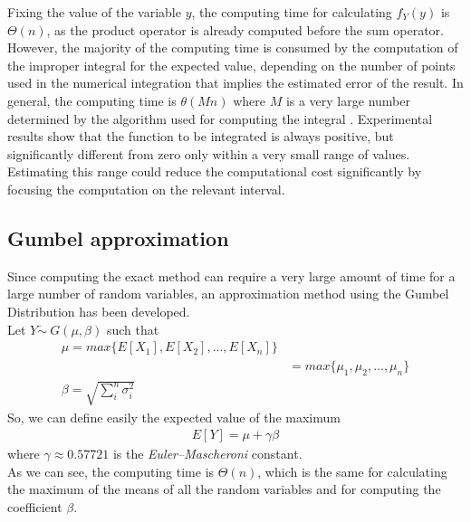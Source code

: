 Fixing the value of the variable $y$, the computing time for calculating $f_Y(y)$ is $\Theta(n)$, as the product operator is already computed before the sum operator. However, the majority of the computing time is consumed by the computation of the improper integral for the expected value, depending on the number of points used in the numerical integration that implies the estimated error of the result. In general, the computing time is $\theta(M n)$ where $M$ is a very large number determined by the algorithm used for computing the integral \cite{2020SciPy-NMeth}.
Experimental results show that the function to be integrated is always positive, but significantly different from zero only within a very small range of values. Estimating this range could reduce the computational cost significantly by focusing the computation on the relevant interval.

\subsection{Gumbel approximation}
Since computing the exact method can require a very large amount of time for a large number of random variables, an approximation method using the Gumbel Distribution has been developed. \\
Let $Y \dot \sim \ G(\mu, \beta)$ such that
\begin{align*}
	\mu = max\{E[X_1], E[X_2], ..., E[X_n]\} \\
	&= max\{\mu_1, \mu_2, ..., \mu_n\} \tag*{(since $X_i \sim N(\mu_i, \sigma_i^2)$)} \\
	\beta = \sqrt{\sum_{i}^n{\sigma_i^2}}
\end{align*}
So, we can define easily the expected value of the maximum
\begin{align*}
	E[Y] = \mu + \gamma \beta
\end{align*}
where $\gamma \approx 0.57721$ is the \textit{Euler–Mascheroni} constant. \\
As we can see, the computing time is $\Theta(n)$, which is the same for calculating the maximum of the means of all the random variables and for computing the coefficient $\beta$.
